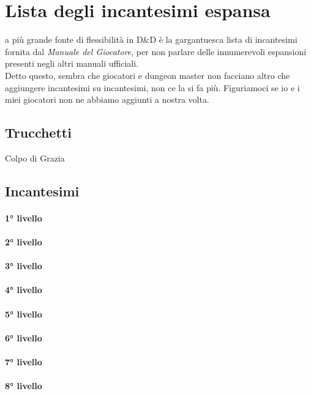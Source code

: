 \section{Lista degli incantesimi espansa}

a più grande fonte di flessibilità in D\&D è la gargantuesca lista di incantesimi fornita dal \textit{Manuale del Giocatore}, per non parlare delle innumerevoli espansioni presenti negli altri manuali ufficiali. \\ Detto questo, sembra che giocatori e dungeon master non facciano altro che aggiungere incantesimi su incantesimi, non ce la si fa più. Figuriamoci se io e i miei giocatori non ne abbiamo aggiunti a nostra volta.

\subsection{Trucchetti} 
Colpo di Grazia

\subsection{Incantesimi}
\paragraph{1° livello}
\paragraph{2° livello}
\paragraph{3° livello}
\paragraph{4° livello}
\paragraph{5° livello}
\paragraph{6° livello}
\paragraph{7° livello}
\paragraph{8° livello}
